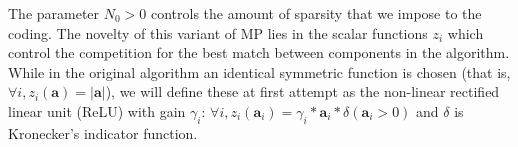 \documentclass[draft]{article} %
\newcommand{\coef}{\mathbf{a}} %
\newcommand{\image}{\mathbf{I}} %
\newcommand{\dico}{\Phi} %
\newcommand{\eqdef}{\ensuremath{\stackrel{\mbox{\upshape\tiny def.}}{=}}}
\newcommand{\seeEq}[1]{Eq.~\ref{eq:#1}}%
\begin{document}
The parameter $N_0>0$ controls the amount of sparsity that we impose to the coding. The novelty of this variant of MP lies in the scalar functions $z_i$ which control the competition for the best match between components in the algorithm. While in the original algorithm an identical symmetric function is chosen (that is, $\forall i, z_i(\coef) = |\coef|$), we will define these at first attempt as the non-linear rectified linear unit (ReLU) with gain $\gamma_i$: $\forall i, z_i (\coef_i) = \gamma_i * \coef_i * \delta(\coef_i>0)$ and $\delta$ is Kronecker's indicator function.
\end{document}
